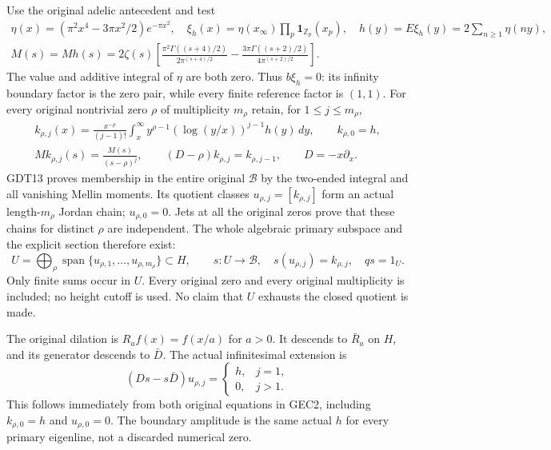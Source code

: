 Use the original adelic antecedent and test
\begin{equation}\tag{GEC1}
 \begin{gathered}
 \eta(x)=(\pi^2x^4-3\pi x^2/2)e^{-\pi x^2},\quad
 \xi_h(x)=\eta(x_\infty)\prod_p\mathbf1_{\mathbb Z_p}(x_p),\quad
 h(y)=E\xi_h(y)=2\sum_{n\ge1}\eta(ny),\\
 M(s)=Mh(s)=2\zeta(s)\left[
 \frac{\pi^2\Gamma((s+4)/2)}{2\pi^{(s+4)/2}}
 -\frac{3\pi\Gamma((s+2)/2)}{4\pi^{(s+2)/2}}\right].
 \end{gathered}
\end{equation}
The value and additive integral of $\eta$ are both zero.
Thus $b\xi_h=0$: its infinity boundary factor is the zero
pair, while every finite reference factor is $(1,1)$.
For every original nontrivial zero $\rho$ of multiplicity
$m_\rho$ retain, for $1\le j\le m_\rho$,
\begin{equation}\tag{GEC2}
 \begin{gathered}
 k_{\rho,j}(x)=\frac{x^{-\rho}}{(j-1)!}
    \int_x^\infty y^{\rho-1}(\log(y/x))^{j-1}h(y)\,dy,\qquad
 k_{\rho,0}=h,\\
 Mk_{\rho,j}(s)=\frac{M(s)}{(s-\rho)^j},\qquad
 (D-\rho)k_{\rho,j}=k_{\rho,j-1},\qquad D=-x\partial_x.
 \end{gathered}
\end{equation}
GDT13 proves membership in the entire original $\mathscr B$ by
the two-ended integral and all vanishing Mellin moments. Its
quotient classes $u_{\rho,j}=[k_{\rho,j}]$ form an actual
length-$m_\rho$ Jordan chain; $u_{\rho,0}=0$. Jets at all the
original zeros prove that these chains for distinct $\rho$
are independent. The whole algebraic primary subspace and
the explicit section therefore exist:
\begin{equation}\tag{GEC3}
 U=\bigoplus_{\rho}\operatorname{span}
       \{u_{\rho,1},\ldots,u_{\rho,m_\rho}\}\subset H,\qquad
 s:U\to\mathscr B,\quad s(u_{\rho,j})=k_{\rho,j},\quad qs=1_U.
\end{equation}
Only finite sums occur in $U$. Every original zero and every
original multiplicity is included; no height cutoff is used.
No claim that $U$ exhausts the closed quotient is made.

The original dilation is $R_a f(x)=f(x/a)$ for $a>0$.
It descends to $\bar R_a$ on $H$, and its generator descends
to $\bar D$. The actual infinitesimal extension is
\begin{equation}\tag{GEC4}
 (Ds-s\bar D)u_{\rho,j}=
          \begin{cases}h,&j=1,\\0,&j>1.\end{cases}
\end{equation}
This follows immediately from both original equations in GEC2,
including $k_{\rho,0}=h$ and $u_{\rho,0}=0$. The boundary
amplitude is the same actual $h$ for every primary eigenline,
not a discarded numerical zero.

